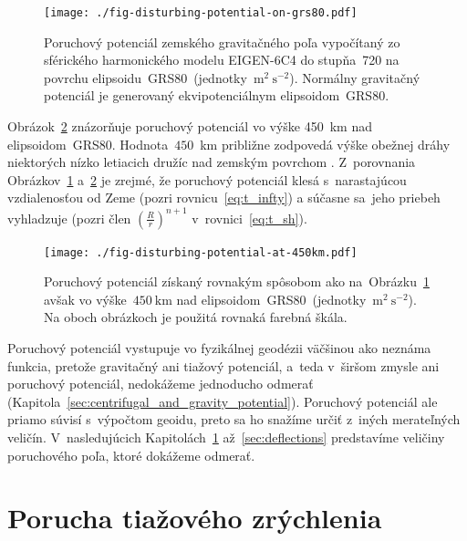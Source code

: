 \documentclass[a4paper, 12pt]{book}
\begin{document}
\begin{figure}
\centering
\texttt{[image: ./fig-disturbing-potential-on-grs80.pdf]}
\caption{Poruchový potenciál zemského gravitačného poľa vypočítaný zo 
sférického harmonického modelu EIGEN-6C4 do stupňa~720 na povrchu 
elipsoidu~GRS80~(jednotky~$\mathrm{m}^2 \ \mathrm{s}^{-2}$).  Normálny 
gravitačný potenciál je generovaný ekvipotenciálnym elipsoidom~GRS80.}
\label{fig:disturbing_potential_on_grs80}
\end{figure}

Obrázok~\ref{fig:disturbing_potential_at_450km} znázorňuje poruchový potenciál 
vo výške 450~km nad elipsoidom~GRS80.  Hodnota~$450$~km približne zodpovedá 
výške obežnej dráhy niektorých nízko letiacich družíc nad zemským povrchom 
\parencite[pozri napríklad][]{MoritzPhysicalGeodesy}.  Z~porovnania 
Obrázkov~\ref{fig:disturbing_potential_on_grs80} 
a~\ref{fig:disturbing_potential_at_450km} je zrejmé, že poruchový potenciál 
klesá s~narastajúcou vzdialenosťou od Zeme (pozri rovnicu~\ref{eq:t_infty}) 
a súčasne sa~jeho priebeh vyhladzuje (pozri člen $\left( \frac{R}{r} \right)^{n 
+ 1}$ v~rovnici~\ref{eq:t_sh}).

\begin{figure}
\centering
\texttt{[image: ./fig-disturbing-potential-at-450km.pdf]}
\caption{Poruchový potenciál získaný rovnakým spôsobom ako 
na~Obrázku~\ref{fig:disturbing_potential_on_grs80} avšak vo výške~$450\ 
\mathrm{km}$ nad elipsoidom~GRS80~(jednotky~$\mathrm{m}^2 \ \mathrm{s}^{-2}$).  
Na oboch obrázkoch je použitá rovnaká farebná škála.}
\label{fig:disturbing_potential_at_450km}
\end{figure}

Poruchový potenciál vystupuje vo fyzikálnej geodézii väčšinou ako neznáma 
funkcia, pretože gravitačný ani tiažový potenciál, a~teda v~širšom zmysle ani 
poruchový potenciál, nedokážeme jednoducho odmerať 
(Kapitola~\ref{sec:centrifugal_and_gravity_potential}).  Poruchový potenciál 
ale priamo súvisí s~výpočtom geoidu, preto sa ho snažíme určiť z~iných 
merateľných veličín.  V~nasledujúcich Kapitolách~\ref{sec:gravity_disturbance} 
až~\ref{sec:deflections} predstavíme veličiny poruchového poľa, ktoré dokážeme 
odmerať.





\section{Porucha tiažového zrýchlenia}
\label{sec:gravity_disturbance}
\end{document}
